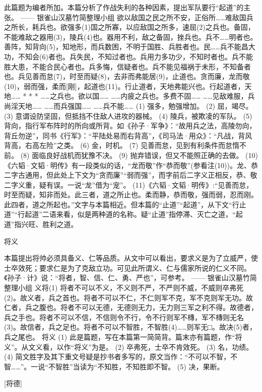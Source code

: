 \documentclass[12pt,UTF8]{ctexbook}
\begin{document}
此篇题为编者所加。本篇分析了作战失利的各种因素，提出军队要行“起道”的主张。
—— 银雀山汉墓竹简整理小组
欲以敌国之民之所不安，正俗所……难敌国兵之所长，耗兵也。欲强多(1)国之所寡，以应敌国之所多，速屈(2)之兵也。备固，不能难敌之器用(3)，陵兵(4)也。器用不利，敌之备固，挫兵也。兵不……明者也。善阵，知背向(5)，知地形，而兵数困，不明于国胜、兵胜者也。民……兵不能昌大功，不知会(6)者也。兵失民，不知过者也。兵用力多功少，不知时者也。兵不能胜大患，不能合民心者也。兵多悔，信疑者也。兵不能见福祸于未形，不知备者也。兵见善而怠(7)，时至而疑(8)，去非而弗能居(9)，止道也。贪而廉，龙而敬(10)，弱而强，柔而[刚]，起道也(11)。行止道者，天地弗能兴也。行起道者，天地……
* * *
……之兵也。欲以国……
……内疲之兵也。多费不固……
……见敌难服，兵尚淫天地……
……而兵强国……
……兵不能……
(1) 强多，勉强增加。
(2) 屈，竭尽。
(3) 意谓设防坚固，但抵挡不住敌人进攻的器械。
(4) 陵兵，被欺凌的军队。
(5) 背向，指行军布阵时的所向或所背。如《孙子·军争》：“故用兵之法，高陵勿向，背丘勿逆”，同书《行军》：“平陆处易而右背高”，《司马法·用众》：“凡战，背风背高，右高左险”之类。
(6) 金，时机。
(7) 见善而怠，见到有利条件而怠惰不前。
(8) 面临良好战机而犹豫不决。
(9) 抛弃错误，但又不能照正确的去做。
(10)《六韬·文韬·明传》有一段类似的话，“龙而敬”作“恭而敬”(参看注(10))。龙、恭二字古通用，但此处上下文为“贪而廉”“弱而强”，而字前后二字义正相反，恭、敬二字义重，疑有误。一说“龙”借为“宠”。
(11)《六韬·文韬·明传》:“见善而怠，时至而疑，知非而处。此三者，道之所止也。柔而静，恭而敬，强而弱，忍而刚。此四者，道之所起也。”文字与本篇相近。但本篇的“止道”“起道”，从下文“行止道”“行起道”二语来看，似是两种道的名称。疑“止道”指停滞、灭亡之道，“起道”指兴旺、胜利之道。

将义

本篇提出将帅必须具备义、仁等品质。从文中可以看出，要求义是为了立威严，使士卒效死；要求仁是为了克敌立功。可见此所谓义、仁与儒家所说的仁义不同。《孙子·计》说：“将者，智、信、仁、勇、严也”，可参考。
—— 银雀山汉墓竹简整理小组
义将(1)
将者不可以不义，不义则不严，不严则不威，不威则卒弗死(2)。故义者，兵之首也。将者不可以不仁，不仁则军不克，军不克则军无功。故仁者，兵之腹也。将者不可以无德，无德则无力，无力则三军之利不得。故德者，兵之手也。将者不可以不信，不信则令不行，令不行则军不槫，军不槫则无名(3)。故信者，兵之足也。将者不可以不智胜，不智胜(4)……则军无□。故决(5)者，兵之尾也。
将义
(1) 此是篇题，写在本篇第一简简背。篇末亦有篇题，作“将义”。从文义看，以作“将义”为是。
(2) 卒弗死，士卒不肯效死。
(3) 名，功绩。
(4) 简文胜字及其下重文号疑是抄书者多写的，原文当作：“不可以不智，不智……”。一说“不智胜”当读为“不知胜，不知胜即不智。
(5) 决，果断。

[将德]
\end{document}
